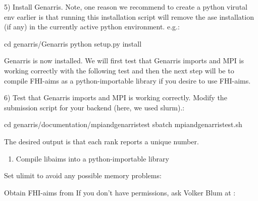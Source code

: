 \documentclass[letterpaper,10pt,english]{sphinxmanual}
\begin{document}
5) Install Genarris. Note, one reason we recommend to create a python virutal env earlier is that running this installation script will remove the ase installation (if any) in the currently active python environment.
e.g.:

\begin{sphinxVerbatim}[commandchars=\\\{\}]
cd \PYGZdl{}genarris/Genarris
python setup.py install
\end{sphinxVerbatim}

Genarris is now installed. We will first test that Genarris imports and MPI is working correctly with the following test and then the next step will be to compile FHI-aims as a python-importable library if you desire to use FHI-aims.

6) Test that Genarris imports and MPI is working correctly.
Modify the submission script for your backend (here, we used slurm).:

\begin{sphinxVerbatim}[commandchars=\\\{\}]
cd \PYGZdl{}genarris/documentation/mpi\PYGZus{}and\PYGZus{}genarris\PYGZus{}test
sbatch mpi\PYGZus{}and\PYGZus{}genarris\PYGZus{}test.sh
\end{sphinxVerbatim}

The desired output is that each rank reports a unique number.
\begin{enumerate}
\def\theenumi{\arabic{enumi}}
\def\labelenumi{\theenumi )}
\makeatletter\def\p@enumii{\p@enumi \theenumi )}\makeatother
\setcounter{enumi}{6}
\item {} 
Compile libaims into a python-importable library

\end{enumerate}

Set ulimit to avoid any possible memory problems:

\begin{sphinxVerbatim}[commandchars=\\\{\}]
  
  

 
\end{sphinxVerbatim}

Obtain FHI-aims from 
If you don't have permissions, ask Volker Blum at :
\end{document}
